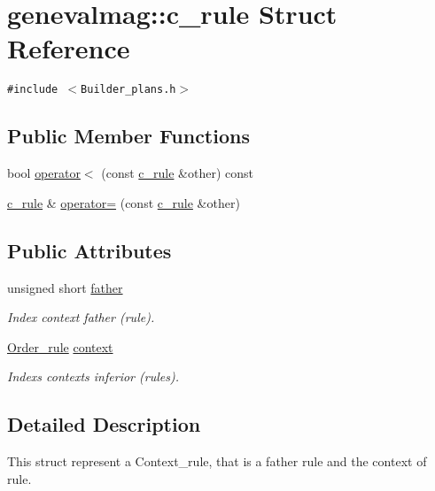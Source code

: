 \hypertarget{structgenevalmag_1_1c__rule}{
\section{genevalmag::c\_\-rule Struct Reference}
\label{structgenevalmag_1_1c__rule}
}
{\tt \#include $<$Builder\_\-plans.h$>$}

\subsection*{Public Member Functions}
\begin{CompactItemize}
\item 
bool \hyperlink{structgenevalmag_1_1c__rule_3928c94cdc0cbf19afd122f7b5f55cba}{operator$<$} (const \hyperlink{structgenevalmag_1_1c__rule}{c\_\-rule} \&other) const 
\item 
\hyperlink{structgenevalmag_1_1c__rule}{c\_\-rule} \& \hyperlink{structgenevalmag_1_1c__rule_84c13f21cf310be7b9f8eb5677806581}{operator=} (const \hyperlink{structgenevalmag_1_1c__rule}{c\_\-rule} \&other)
\end{CompactItemize}
\subsection*{Public Attributes}
\begin{CompactItemize}
\item 
unsigned short \hyperlink{structgenevalmag_1_1c__rule_be7fed1600af3652ab298ac2a897b18f}{father}
\begin{CompactList}\small\item\em Index context father (rule). \item\end{CompactList}\item 
\hyperlink{namespacegenevalmag_ed20da32fb9692645ae53d911d274fd5}{Order\_\-rule} \hyperlink{structgenevalmag_1_1c__rule_f0b0004a1f307e5cb18ed26d3e983f1d}{context}
\begin{CompactList}\small\item\em Indexs contexts inferior (rules). \item\end{CompactList}\end{CompactItemize}


\subsection{Detailed Description}
This struct represent a Context\_\-rule, that is a father rule and the context of rule. 

